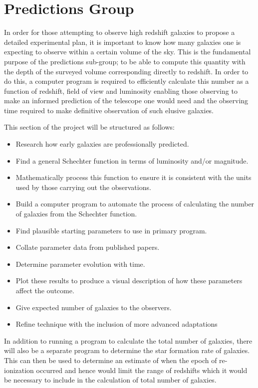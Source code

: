 
\section{Predictions Group} %
\label{sec:predictions_group} 
	In order for those attempting to observe high redshift galaxies to propose a detailed experimental plan, it is important to know how many galaxies one is expecting to observe within a certain volume of the sky. This is the fundamental purpose of the predictions sub-group; to be able to compute this quantity with the depth of the surveyed volume corresponding directly to redshift. In order to do this, a computer program is required to efficiently calculate this number as a function of redshift, field of view and luminosity enabling those observing to make an informed prediction of the telescope one would need and the observing time required to make definitive observation of such elusive galaxies. 
	
	This section of the project will be structured as follows: 
	\begin{itemize}
		\item Research how early galaxies are professionally predicted. 
		\item Find a general Schechter function in terms of luminosity and/or magnitude. 
		\item Mathematically process this function to ensure it is consistent with the units used by those carrying out the observations. 
		\item Build a computer program to automate the process of calculating the number of galaxies from the Schechter function. 
		\item Find plausible starting parameters to use in primary program.
		\item Collate parameter data from published papers. 
		\item Determine parameter evolution with time. 
		\item Plot these results to produce a visual description of how these parameters affect the outcome. 
		\item Give expected number of galaxies to the observers. 
		\item Refine technique with the inclusion of more advanced adaptations
	\end{itemize}

	In addition to running a program to calculate the total number of galaxies, there will also be a separate program to determine the star formation rate of galaxies. This can then be used to determine an estimate of when the epoch of re-ionization occurred and hence would limit the range of redshifts which it would be necessary to include in the calculation of total number of galaxies. 

